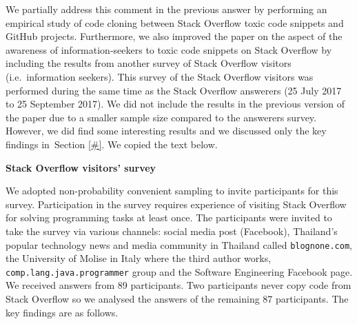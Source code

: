 \documentclass[a4paper,twoside,10pt]{reviewresponse}
\begin{document}

We partially address this comment in the previous answer by performing an empirical study of code cloning between Stack Overflow toxic code snippets and GitHub projects. Furthermore, we also improved the paper on the aspect of the awareness of information-seekers to toxic code snippets on Stack Overflow by including the results from another survey of Stack Overflow visitors (i.e.~information seekers). This survey of the Stack Overflow visitors was performed during the same time as the Stack Overflow answerers (25 July 2017 to 25 September 2017). We did not include the results in the previous version of the paper due to a smaller sample size compared to the answerers survey. However, we did find some interesting results and we discussed only the key findings in~Section \ref{#}. We copied the text below.

\textbf{Stack Overflow visitors' survey}

We adopted non-probability convenient sampling to invite participants for this survey. Participation in the survey requires experience of visiting Stack Overflow for solving programming tasks at least once. The participants were invited to take the survey via various channels: social media post (Facebook), Thailand's popular technology news and media community in Thailand called \texttt{blognone.com}, the University of Molise in Italy where the third author works, \texttt{comp.lang.java.programmer} group and the Software Engineering Facebook page. We received answers from 89 participants. Two participants never copy code from Stack Overflow so we analysed the answers of the remaining 87 participants. The key findings are as follows.
\end{document}
